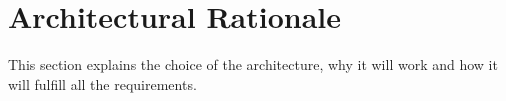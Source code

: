 \section{Architectural Rationale}
This section explains the choice of the architecture, why it will work and how it will fulfill all the requirements.

